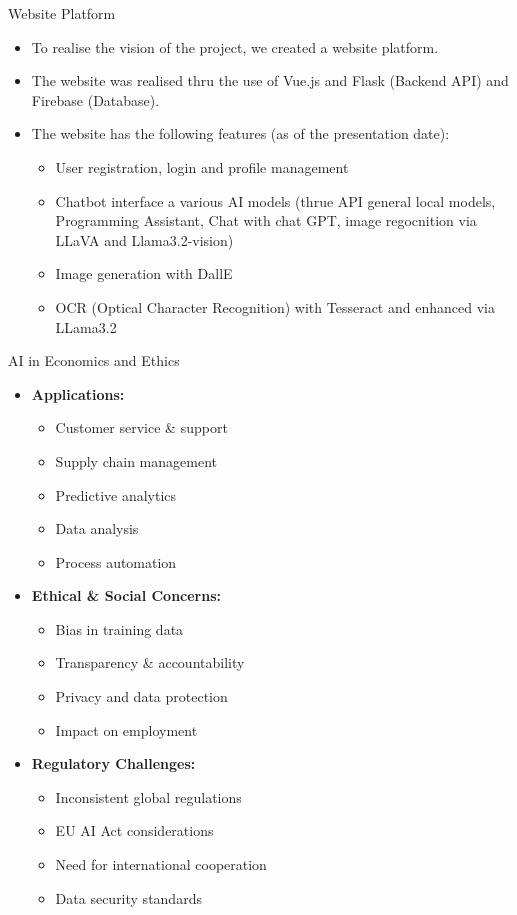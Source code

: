 \documentclass{beamer}
\begin{document}
\begin{frame}{Website Platform}
  \begin{itemize}
    \item To realise the vision of the project, we created a website platform. 
    \item The website was realised thru the use of Vue.js and Flask (Backend API) and Firebase (Database).
    \item The website has the following features (as of the presentation date):
    \begin{itemize}
      \item User registration, login and profile management
      \item Chatbot interface a various AI models (thrue API general local models, Programming Assistant, Chat with chat GPT, image regocnition via LLaVA and Llama3.2-vision)
      \item Image generation with DallE
      \item OCR (Optical Character Recognition) with Tesseract and enhanced via LLama3.2
    \end{itemize}
    \end{itemize}
\end{frame}

\begin{frame}{AI in Economics and Ethics}
  \begin{itemize}
    \item \textbf{Applications:}
      \begin{itemize}
        \item Customer service & support
        \item Supply chain management
        \item Predictive analytics
        \item Data analysis
        \item Process automation
      \end{itemize}
    \item \textbf{Ethical & Social Concerns:}
      \begin{itemize}
        \item Bias in training data
        \item Transparency \& accountability
        \item Privacy and data protection
        \item Impact on employment
      \end{itemize}
    \item \textbf{Regulatory Challenges:}
      \begin{itemize}
        \item Inconsistent global regulations
        \item EU AI Act considerations
        \item Need for international cooperation
        \item Data security standards
      \end{itemize}
  \end{itemize}
\end{frame}
\end{document}

